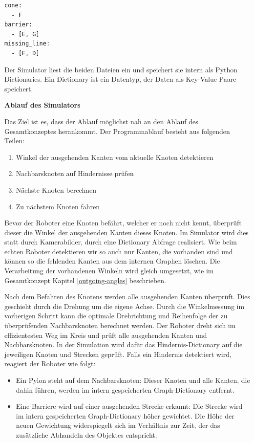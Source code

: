 \begin{verbatim}
cone:
  - F
barrier:
  - [E, G]
missing_line:
  - [E, D]
\end{verbatim}

Der Simulator liest die beiden Dateien ein und speichert sie intern als Python Dictionaries. Ein Dictionary ist ein Datentyp, der Daten als Key-Value Paare speichert.

\textbf{Ablauf des Simulators}

Das Ziel ist es, dass der Ablauf möglichst nah an den Ablauf des Gesamtkonzeptes herankommt.
Der Programmablauf besteht aus folgenden Teilen:
\begin{enumerate}
    \item Winkel der ausgehenden Kanten vom aktuelle Knoten detektieren
    \item Nachbarsknoten auf Hindernisse prüfen
    \item Nächste Knoten berechnen
    \item Zu nächstem Knoten fahren
\end{enumerate}

Bevor der Roboter eine Knoten befährt, welcher er noch nicht kennt, überprüft dieser die Winkel der ausgehenden Kanten dieses Knoten. Im Simulator wird dies statt durch Kamerabilder, durch eine Dictionary Abfrage realisiert.
Wie beim echten Roboter detektieren wir so auch nur Kanten, die vorhanden sind und können so die fehlenden Kanten aus dem internen Graphen löschen. Die Verarbeitung der vorhandenen Winkeln wird gleich umgesetzt, wie im Gesamtkonzept Kapitel \ref{outgoing-angles} beschrieben.

Nach dem Befahren des Knotens werden alle ausgehenden Kanten überprüft. Dies geschieht durch die Drehung um die eigene Achse. Durch die Winkelmessung im vorherigen Schritt kann die optimale Drehrichtung und Reihenfolge der zu überprüfenden Nachbarsknoten berechnet werden. Der Roboter dreht sich im effizientesten Weg im Kreis und prüft alle ausgehenden Kanten und Nachbarsknoten. 
In der Simulation wird dafür das Hindernis-Dictionary auf die jeweiligen Knoten und Strecken geprüft. Falls ein Hindernis detektiert wird, reagiert der Roboter wie folgt:

\begin{itemize}
    \item Ein Pylon steht auf dem Nachbarsknoten: Dieser Knoten und alle Kanten, die dahin führen, werden im intern gespeicherten Graph-Dictionary entfernt.
    \item Eine Barriere wird auf einer ausgehenden Strecke erkannt: Die Strecke wird im intern gespeicherten Graph-Dictionary höher gewichtet. Die Höhe der neuen Gewichtung widerspiegelt sich im Verhältnis zur Zeit, der das zusätzliche Abhandeln des Objektes entspricht.
\end{itemize}

